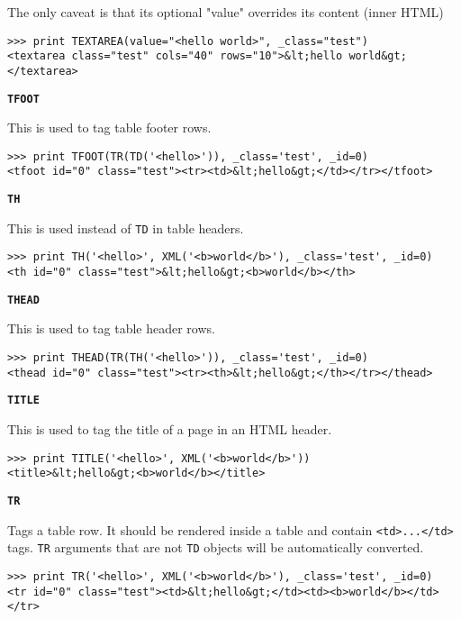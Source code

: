 \documentclass[justified,sixbynine,notoc]{tufte-book}
\def\ft{\small\tt}
\def\inxx#1{\index{#1}}
\begin{document}
\begin{fullwidth}
The only caveat is that its optional "value" overrides its content (inner HTML)
\begin{lstlisting}
>>> print TEXTAREA(value="<hello world>", _class="test")
<textarea class="test" cols="40" rows="10">&lt;hello world&gt;</textarea>
\end{lstlisting}

{\bf {\ft TFOOT}}

\inxx{TFOOT}

This is used to tag table footer rows.
\begin{lstlisting}
>>> print TFOOT(TR(TD('<hello>')), _class='test', _id=0)
<tfoot id="0" class="test"><tr><td>&lt;hello&gt;</td></tr></tfoot>
\end{lstlisting}

{\bf {\ft TH}}

\inxx{TH}

This is used instead of {\ft TD} in table headers.
\begin{lstlisting}
>>> print TH('<hello>', XML('<b>world</b>'), _class='test', _id=0)
<th id="0" class="test">&lt;hello&gt;<b>world</b></th>
\end{lstlisting}

{\bf {\ft THEAD}}

\inxx{THEAD}

This is used to tag table header rows.
\begin{lstlisting}
>>> print THEAD(TR(TH('<hello>')), _class='test', _id=0)
<thead id="0" class="test"><tr><th>&lt;hello&gt;</th></tr></thead>
\end{lstlisting}

{\bf {\ft TITLE}}

\inxx{TITLE}

This is used to tag the title of a page in an HTML header.
\begin{lstlisting}
>>> print TITLE('<hello>', XML('<b>world</b>'))
<title>&lt;hello&gt;<b>world</b></title>
\end{lstlisting}

{\bf {\ft TR}}

\inxx{TR}

Tags a table row. It should be rendered inside a table and contain {\ft <td>...</td>} tags. {\ft TR} arguments that are not {\ft TD} objects will be automatically converted.
\begin{lstlisting}
>>> print TR('<hello>', XML('<b>world</b>'), _class='test', _id=0)
<tr id="0" class="test"><td>&lt;hello&gt;</td><td><b>world</b></td></tr>
\end{lstlisting}


\end{fullwidth}
\end{document}
